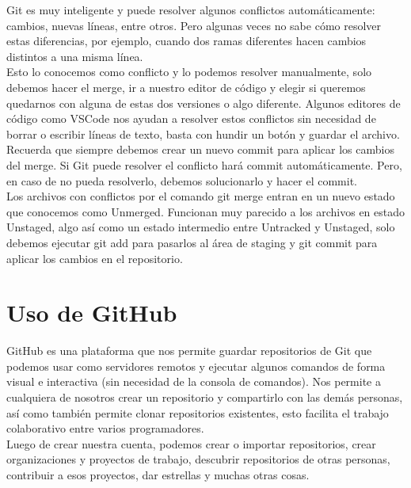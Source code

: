 \documentclass{article}
\begin{document}
Git es muy inteligente y puede resolver algunos conflictos automáticamente:
cambios, nuevas líneas, entre otros. Pero algunas veces no sabe cómo resolver
estas diferencias, por ejemplo, cuando dos ramas diferentes hacen cambios
distintos a una misma línea.\\

Esto lo conocemos como conflicto y lo podemos resolver manualmente, solo
debemos hacer el merge, ir a nuestro editor de código y elegir si queremos
quedarnos con alguna de estas dos versiones o algo diferente. Algunos editores
de código como VSCode nos ayudan a resolver estos conflictos sin necesidad de
borrar o escribir líneas de texto, basta con hundir un botón y guardar el
archivo.\\

Recuerda que siempre debemos crear un nuevo commit para aplicar los cambios del
merge. Si Git puede resolver el conflicto hará commit automáticamente. Pero, en
caso de no pueda resolverlo, debemos solucionarlo y hacer el commit.\\

Los archivos con conflictos por el comando git merge entran en un nuevo estado
que conocemos como Unmerged. Funcionan muy parecido a los archivos en estado
Unstaged, algo así como un estado intermedio entre Untracked y Unstaged, solo
debemos ejecutar git add para pasarlos al área de staging y git commit para
aplicar los cambios en el repositorio.\\

\newpage

\section{Uso de GitHub}%
GitHub es una plataforma que nos permite guardar repositorios de Git que
podemos usar como servidores remotos y ejecutar algunos comandos de forma
visual e interactiva (sin necesidad de la consola de comandos). Nos permite a
cualquiera de nosotros crear un repositorio y compartirlo con las demás
personas, así como también permite clonar repositorios existentes, esto
facilita el trabajo colaborativo entre varios programadores.\\

Luego de crear nuestra cuenta, podemos crear o importar repositorios, crear
organizaciones y proyectos de trabajo, descubrir repositorios de otras
personas, contribuir a esos proyectos, dar estrellas y muchas otras cosas.\\
\end{document}
